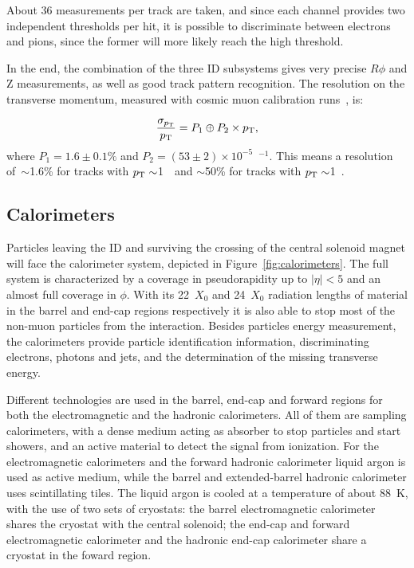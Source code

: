 About 36 measurements per track are taken, and since each channel provides two independent thresholds per hit,
it is possible to discriminate between electrons and pions, since the former will more likely reach the
high threshold.

In the end, the combination of the three ID subsystems gives very precise $R\phi$ and Z measurements, as well as good track pattern recognition.
The resolution on the transverse momentum, measured with cosmic muon calibration runs~\cite{id_cosmic}, is:

\begin{equation}\label{eq:momentumres}
\frac{\sigma_{\pt}}{\pt}=P_1 \oplus P_2 \times \pt,
	\end{equation}
where $P_1=1.6\pm0.1\%$ and $P_2=(53\pm2)\times10^{-5}$~\GeV$^{-1}$. This means a 
resolution of~$\sim$1.6\% for tracks with $\pt\sim$1~\GeV\ and 
$\sim$50\% for tracks with $\pt\sim$1~\tev.


\subsection{Calorimeters}\label{sec:calo}

Particles leaving the ID and surviving the crossing of the central solenoid magnet
will face the calorimeter system, depicted in Figure~\ref{fig:calorimeters}.
The full system is characterized by a coverage
in pseudorapidity up to $|\eta|<5$ and an almost full coverage in $\phi$. With its 
22~$X_0$ and 24~$X_0$ radiation lengths of material in the barrel and end-cap regions respectively 
it is also able to stop most of the non-muon particles from the interaction.
Besides particles energy measurement, the calorimeters provide particle identification
information, discriminating electrons, photons and jets, and the determination
of the missing transverse energy.

Different technologies are used in the barrel, end-cap and forward regions for both the
electromagnetic and the hadronic calorimeters. All of them are sampling calorimeters,
with a dense medium acting as absorber to stop particles and start showers, and an
active material to detect the signal from ionization. For the electromagnetic calorimeters
and the forward hadronic calorimeter liquid argon is used as active medium, while the
barrel and extended-barrel hadronic calorimeter uses scintillating tiles.
The liquid argon is cooled at a temperature of about 88~K, with the use of two sets of cryostats:
the barrel electromagnetic calorimeter shares the cryostat with the central solenoid;
the end-cap and forward electromagnetic calorimeter and the hadronic end-cap calorimeter
share a cryostat in the foward region.

